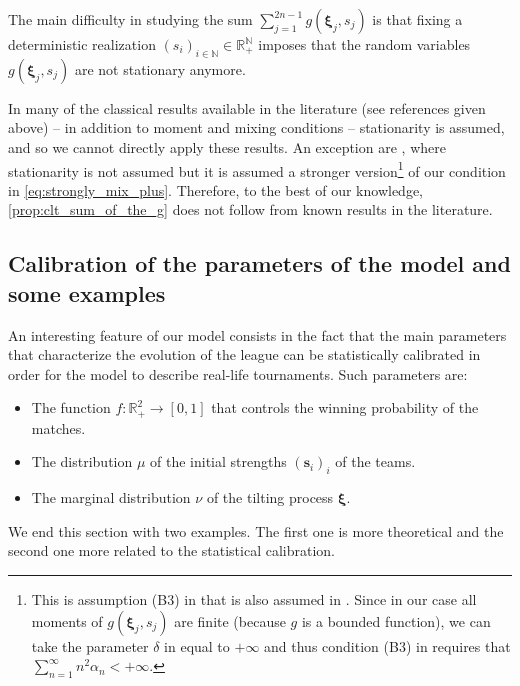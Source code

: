 \documentclass[11pt,a4paper,oneside]{article}
\theoremstyle{definition}
\theoremstyle{remark}
\def\N{\mathbb{N}}
\def\R{\mathbb{R}}
\begin{document}
The main difficulty in studying the sum $\sum_{j=1}^{2n-1}g\left(\bm \xi_j,s_j\right)$ is that fixing a deterministic realization $(s_i)_{{i\in\N}}\in\R^{\N}_{+}$ imposes that the random variables $g\left(\bm \xi_j,s_j\right)$ are not stationary anymore.


In many of the classical results available in the literature (see references given above) -- in addition to moment and mixing conditions -- stationarity is assumed, and so we cannot directly apply these results. An exception are \cite{MR1492353,MR3257385}, where stationarity is not assumed but it is assumed a stronger version\footnote{This is assumption (B3) in \cite{MR3257385} that is also assumed in \cite{MR1492353}. Since in our case all moments of $g\left(\bm \xi_j,s_j\right)$ are finite (because $g$ is a bounded function), we can take the parameter $\delta$ in \cite{MR3257385} equal to $+\infty$ and thus condition (B3) in \cite{MR3257385} requires that $\sum_{n=1}^{\infty} n^2 \alpha_n <+\infty$.} of our condition in \cref{eq:strongly_mix_plus}. Therefore, to the best of our knowledge, \cref{prop:clt_sum_of_the_g} does not follow from known results in the literature.






\subsection{Calibration of the parameters of the model and some examples}\label{sect:param_and_examples}

An interesting feature of our model consists in the fact that the main parameters that characterize the evolution of the league can be statistically calibrated in order for the model to describe real-life tournaments. Such parameters are:

\begin{itemize}
\item The function $f:\mathbb R_+^2\to[0,1]$ that controls the winning probability of the matches.
\item The distribution $\mu$ of the initial strengths $(\bm s_i)_i$ of the teams.
\item The marginal distribution $\nu$ of the tilting process $\bm \xi$.
\end{itemize}

We end this section with two examples. The first one is more theoretical and the second one more related to the statistical calibration.
\end{document}
